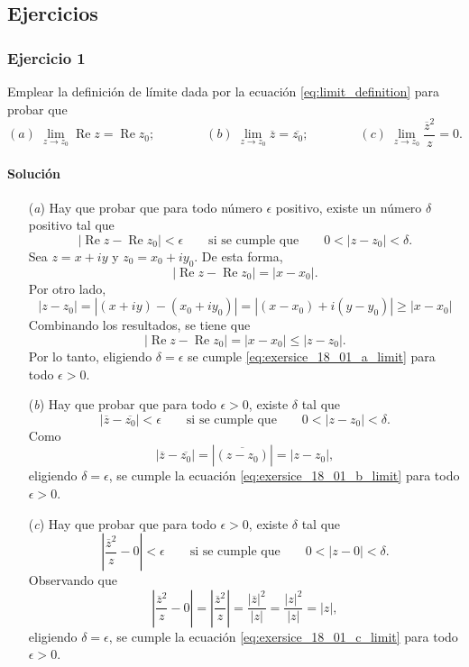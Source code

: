\documentclass[a4paper]{report}
\renewcommand{\Re}{\operatorname{Re}}
\begin{document}
\subsection{Ejercicios}

\subsubsection{Ejercicio 1}

Emplear la definición de límite dada por la ecuación \ref{eq:limit_definition} para probar que 
\[
 (\textit{a})\;\lim_{z\to z_0}\Re z=\Re z_0;\qquad\qquad 
 (\textit{b})\;\lim_{z\to z_0}\overline{z}=\overline{z_0};\qquad\qquad
 (\textit{c})\;\lim_{z\to z_0}\frac{\overline{z}^2}{z}=0.
\]

\paragraph{Solución} 
\begin{enumerate}
 \item[(\textit{a})] Hay que probar que para todo número \(\epsilon\) positivo, existe un número \(\delta\) positivo tal que 
\begin{equation}\label{eq:exersice_18_01_a_limit}
 |\Re z-\Re z_0|<\epsilon
 \qquad\textrm{si se cumple que}\qquad
 0<|z-z_0|<\delta.
\end{equation}
Sea \(z=x+iy\) y \(z_0=x_0+iy_0\). De esta forma,
\[
 |\Re z-\Re z_0|=|x-x_0|.
\]
Por otro lado,
\[
 |z-z_0|=|(x+iy)-(x_0+iy_0)|=|(x-x_0)+i(y-y_0)|\geq|x-x_0|
\]
Combinando los resultados, se tiene que 
\[
 |\Re z-\Re z_0|=|x-x_0|\leq|z-z_0|.
\]
Por lo tanto, eligiendo \(\delta=\epsilon\) se cumple \ref{eq:exersice_18_01_a_limit} para todo \(\epsilon>0\).
\item[(\textit{b})] Hay que probar que para todo \(\epsilon>0\), existe \(\delta\) tal que
\begin{equation}\label{eq:exersice_18_01_b_limit}
 |\overline{z}-\overline{z_0}|<\epsilon
 \qquad\textrm{si se cumple que}\qquad
 0<|z-z_0|<\delta.
\end{equation}
Como 
\[
 |\overline{z}-\overline{z_0}|=|\overline{(z-z_0)}|=|z-z_0|,
\]
eligiendo \(\delta=\epsilon\), se cumple la ecuación \ref{eq:exersice_18_01_b_limit} para todo \(\epsilon>0\).
\item[(\textit{c})] Hay que probar que para todo \(\epsilon>0\), existe \(\delta\) tal que
\begin{equation}\label{eq:exersice_18_01_c_limit}
 \left|\frac{\overline{z}^2}{z}-0\right|<\epsilon
 \qquad\textrm{si se cumple que}\qquad
 0<|z-0|<\delta.
\end{equation}
Observando que 
\[
 \left|\frac{\overline{z}^2}{z}-0\right|=\left|\frac{\overline{z}^2}{z}\right|=\frac{|\overline{z}|^2}{|z|}=\frac{|z|^2}{|z|}=|z|,
\]
eligiendo \(\delta=\epsilon\), se cumple la ecuación \ref{eq:exersice_18_01_c_limit} para todo \(\epsilon>0\).
\end{enumerate}
\end{document}
